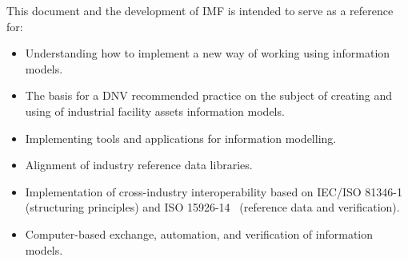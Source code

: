 \documentclass[../main.tex]{subfiles}
\begin{document}

This document and the development of IMF is intended to serve as a reference for:

\begin{itemize}
  \item Understanding how to implement a new way of working using information models.
  \item The basis for a DNV recommended practice on the subject of creating and using of industrial facility assets information models.
  \item Implementing tools and applications for information modelling.
  \item Alignment of industry reference data libraries.
  \item Implementation of cross-industry interoperability based on IEC/ISO 81346-1~\cite{81346-1} (structuring principles) and
        ISO 15926-14~\cite{15926-14} (reference data and verification).
  \item Computer-based exchange, automation, and verification of information models.
\end{itemize}
\end{document}
